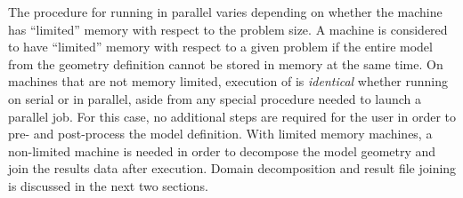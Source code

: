 The procedure for running \tahoe in parallel varies depending on whether the
machine has ``limited'' memory with respect to the problem size.  A machine
is considered to have ``limited'' memory with respect to a given problem if
the entire model from the geometry definition cannot be stored in memory at
the same time.  On machines that are not memory limited, execution of \tahoe
is \emph{identical} whether running on serial or in parallel, aside from any
special procedure needed to launch a parallel job.  For this case, no
additional steps are required for the user in order to pre- and post-process 
the model definition.  With limited memory machines, a non-limited
machine is needed in order to decompose the model geometry and join the
results data after execution.  Domain decomposition and result file joining
is discussed in the next two sections.

